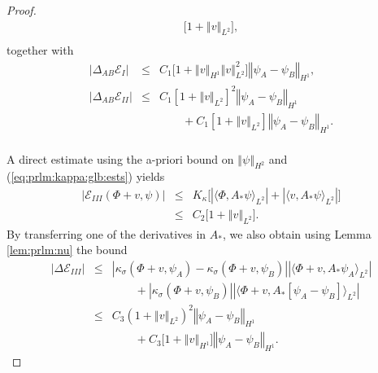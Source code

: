 \documentclass[10pt]{articleHJ}
\newcommand{\abs}[1]{\left\vert#1\right\vert}			%
\newcommand{\norm}[1]{\left\Vert#1\right\Vert}		%
\newcommand{\sref}[1]{(\ref{#1})}                       %
\numberwithin{equation}{section}
\begin{document}
\begin{proof}
\begin{equation}
\begin{array}{lcl}
    \big[1 + \norm{v}_{L^2} \big] ,
\\[0.2cm]
\end{array}
\end{equation}
together with
\begin{equation}
\begin{array}{lcl}
\abs{\Delta_{AB} \mathcal{E}_{I}}
  & \le & C_1 \big[ 1  + \norm{v}_{H^1} \norm{v}_{L^2}^2 \big]
      \norm{\psi_A - \psi_B}_{H^1} ,
\\[0.2cm]
\abs{\Delta_{AB} \mathcal{E}_{II}}
 & \le &   C_1  [ 1+ \norm{v}_{L^2}]^2
  \norm{\psi_A - \psi_B}_{H^1}
\\[0.2cm]
& & \qquad
  + C_1  [1 + \norm{v}_{L^2} ]
    \norm{\psi_A - \psi_B}_{H^1} .
\\[0.2cm]
\end{array}
\end{equation}

A direct estimate using
the a-priori bound on $\norm{\psi}_{H^2}$
and \sref{eq:prlm:kappa:glb:ests}
yields
\begin{equation}
\begin{array}{lcl}
\abs{\mathcal{E}_{III}(\Phi + v, \psi)}
 & \le & K_{\kappa}
 \big[
    \abs{ \langle \Phi, A_* \psi \rangle_{L^2} }
    + \abs{ \langle v , A_* \psi \rangle_{L^2} }
 \big]
\\[0.2cm]
& \le &
 C_2 \big[1 + \norm{v}_{L^2} \big].
\end{array}
\end{equation}
By transferring one of the derivatives in $A_*$,
we also obtain using Lemma \ref{lem:prlm:nu} the bound
\begin{equation}
\begin{array}{lcl}
\abs{\Delta\mathcal{E}_{III}}
 & \le &
  \abs{\kappa_{\sigma}(\Phi + v , \psi_A)
  - \kappa_{\sigma}(\Phi + v, \psi_B) }
    \abs{ \langle \Phi + v , A_* \psi_A \rangle_{L^2} }
\\[0.2cm]
& & \qquad
+ \abs{\kappa_{\sigma}(\Phi + v, \psi_B) }
   \abs{ \langle \Phi + v ,
      A_* [\psi_A - \psi_B] \rangle_{L^2}
   }
\\[0.2cm]
& \le &
 C_3 (1 + \norm{v}_{L^2})^2 \norm{\psi_A - \psi_B}_{H^1}
\\[0.2cm]
& & \qquad
    + C_3 \big[ 1 + \norm{v}_{H^1} \big]
      \norm{\psi_A - \psi_B}_{H^1} .
\end{array}
\end{equation}


\end{proof}
\end{document}
